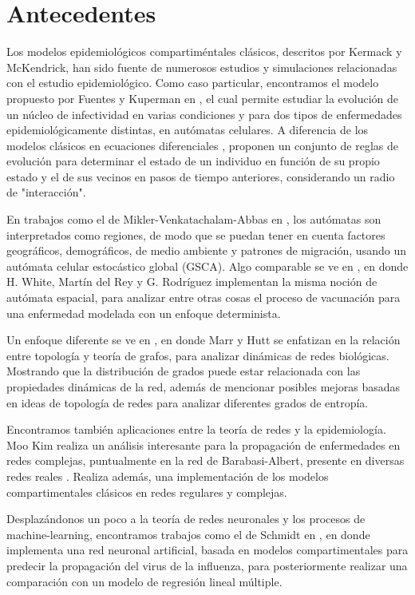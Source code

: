 \documentclass{article}
\begin{document}
\section{Antecedentes}
Los modelos epidemiológicos compartiméntales clásicos, descritos por Kermack y McKendrick, han sido fuente de numerosos estudios y simulaciones relacionadas con el estudio epidemiológico. Como caso particular, encontramos el modelo propuesto por Fuentes y Kuperman en \cite{spatialDependences}, el cual permite estudiar la evolución de un núcleo de infectividad en varias condiciones y para dos tipos de enfermedades epidemiológicamente distintas, en autómatas celulares. A diferencia de los modelos clásicos en ecuaciones diferenciales \cite{diego2010}, proponen un conjunto de reglas de evolución para determinar el estado de un individuo en función de su propio estado y el de sus vecinos en pasos de tiempo anteriores, considerando un radio de "interacción".

En trabajos como el de Mikler-Venkatachalam-Abbas en \cite{globalStochastic}, los autómatas son interpretados como regiones, de modo que se puedan tener en cuenta factores geográficos, demográficos, de medio ambiente y patrones de migración, usando un autómata celular estocástico global (GSCA). Algo comparable se ve en \cite{modelingEpidemicsUsingCA}, en donde H. White, Martín del Rey y G. Rodríguez implementan la misma noción de autómata espacial, para analizar entre otras cosas el proceso de vacunación para una enfermedad modelada con un enfoque determinista.

Un enfoque diferente se ve en \cite{entropyDynamics}, en donde Marr y Hutt se enfatizan en la relación entre topología y teoría de grafos, para analizar dinámicas de redes biológicas. Mostrando que la distribución de grados puede estar relacionada con las propiedades dinámicas de la red, además de mencionar posibles mejoras basadas en ideas de topología de redes para analizar diferentes grados de entropía.

Encontramos también aplicaciones entre la teoría de redes y la epidemiología. Moo Kim realiza un análisis interesante para la propagación de enfermedades en redes complejas, puntualmente en la red de Barabasi-Albert, presente en diversas redes reales \cite{redesComplejas}. Realiza además, una implementación de los modelos compartimentales clásicos en redes regulares y complejas.

Desplazándonos un poco a la teoría de redes neuronales y los procesos de machine-learning, encontramos trabajos como el de Schmidt en \cite{schmidt2019}, en donde implementa una red neuronal artificial, basada en modelos compartimentales para predecir la propagación del virus de la influenza, para posteriormente realizar una comparación con un modelo de regresión lineal múltiple. 
\end{document}
